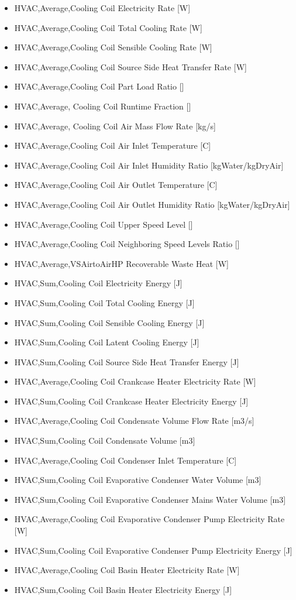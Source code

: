\begin{itemize}
\item
  HVAC,Average,Cooling Coil Electricity Rate {[}W{]}
\item
  HVAC,Average,Cooling Coil Total Cooling Rate {[}W{]}
\item
  HVAC,Average,Cooling Coil Sensible Cooling Rate {[}W{]}
\item
  HVAC,Average,Cooling Coil Source Side Heat Transfer Rate {[}W{]}
\item
  HVAC,Average,Cooling Coil Part Load Ratio {[]}
\item
  HVAC,Average, Cooling Coil Runtime Fraction {[]}
\item
  HVAC,Average, Cooling Coil Air Mass Flow Rate {[}kg/s{]}
\item
  HVAC,Average,Cooling Coil Air Inlet Temperature {[}C{]}
\item
  HVAC,Average,Cooling Coil Air Inlet Humidity Ratio {[}kgWater/kgDryAir{]}
\item
  HVAC,Average,Cooling Coil Air Outlet Temperature {[}C{]}
\item
  HVAC,Average,Cooling Coil Air Outlet Humidity Ratio {[}kgWater/kgDryAir{]}
\item
  HVAC,Average,Cooling Coil Upper Speed Level {[]}
\item
  HVAC,Average,Cooling Coil Neighboring Speed Levels Ratio {[]}
\item
  HVAC,Average,VSAirtoAirHP Recoverable Waste Heat {[}W{]}
\item
  HVAC,Sum,Cooling Coil Electricity Energy {[}J{]}
\item
  HVAC,Sum,Cooling Coil Total Cooling Energy {[}J{]}
\item
  HVAC,Sum,Cooling Coil Sensible Cooling Energy {[}J{]}
\item
  HVAC,Sum,Cooling Coil Latent Cooling Energy {[}J{]}
\item
  HVAC,Sum,Cooling Coil Source Side Heat Transfer Energy {[}J{]}
\item
  HVAC,Average,Cooling Coil Crankcase Heater Electricity Rate {[}W{]}
\item
  HVAC,Sum,Cooling Coil Crankcase Heater Electricity Energy {[}J{]}
\item
  HVAC,Average,Cooling Coil Condensate Volume Flow Rate {[}m3/s{]}
\item
  HVAC,Sum,Cooling Coil Condensate Volume {[}m3{]}
\item
  HVAC,Average,Cooling Coil Condenser Inlet Temperature {[}C{]}
\item
  HVAC,Sum,Cooling Coil Evaporative Condenser Water Volume {[}m3{]}
\item
  HVAC,Sum,Cooling Coil Evaporative Condenser Mains Water Volume {[}m3{]}
\item
  HVAC,Average,Cooling Coil Evaporative Condenser Pump Electricity Rate {[}W{]}
\item
  HVAC,Sum,Cooling Coil Evaporative Condenser Pump Electricity Energy {[}J{]}
\item
  HVAC,Average,Cooling Coil Basin Heater Electricity Rate {[}W{]}
\item
  HVAC,Sum,Cooling Coil Basin Heater Electricity Energy {[}J{]}
\end{itemize}


